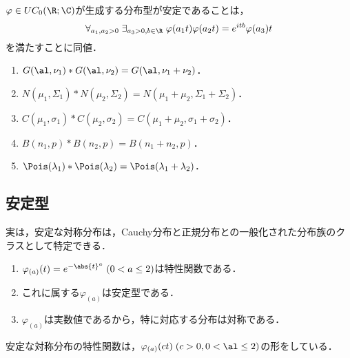 \documentclass[uplatex,dvipdfmx]{jsreport}
\begin{document}
\begin{proposition}
    $\varphi\in UC_0(\R;\C)$が生成する分布型が安定であることは，
    \[\forall_{a_1,a_2>0}\;\exists_{a_3>0,b\in\R}\;\varphi(a_1t)\varphi(a_2t)=e^{itb}\varphi(a_3)t\]
    を満たすことに同値．
\end{proposition}

\begin{example}\mbox{}\label{exp-reproducing-families}
    \begin{enumerate}
        \item $G(\al,\nu_1)*G(\al,\nu_2)=G(\al,\nu_1+\nu_2)$．
        \item $N(\mu_1,\Sigma_1)*N(\mu_2,\Sigma_2)=N(\mu_1+\mu_2,\Sigma_1+\Sigma_2)$．
        \item $C(\mu_1,\sigma_1)*C(\mu_2,\sigma_2)=C(\mu_1+\mu_2,\sigma_1+\sigma_2)$．
        \item $B(n_1,p)*B(n_2,p)=B(n_1+n_2,p)$．
        \item $\Pois(\lambda_1)*\Pois(\lambda_2)=\Pois(\lambda_1+\lambda_2)$．
    \end{enumerate}
\end{example}

\subsection{安定型}

\begin{tcolorbox}[colframe=ForestGreen, colback=ForestGreen!10!white,breakable,colbacktitle=ForestGreen!40!white,coltitle=black,fonttitle=\bfseries\sffamily,
title=]
    実は，安定な対称分布は，Cauchy分布と正規分布との一般化された分布族のクラスとして特定できる．
\end{tcolorbox}

\begin{lemma}\mbox{}
    \begin{enumerate}
        \item $\varphi_{(a)}(t)=e^{-\abs{t}^a}\;(0<a\le 2)$は特性関数である．
        \item これに属する$\varphi_{(a)}$は安定型である．
        \item $\varphi_{(a)}$は実数値であるから，特に対応する分布は対称である．
    \end{enumerate}
\end{lemma}

\begin{theorem}
    安定な対称分布の特性関数は，$\varphi_{(a)}(ct)\;(c>0,0<\al\le 2)$の形をしている．
\end{theorem}
\end{document}
